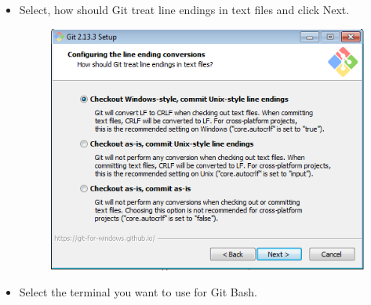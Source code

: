 \documentclass[11pt]{article} %
\begin{document}
\begin{itemize}
        \pagebreak
        \item Select, how should Git treat line endings in text files and click Next. 
        \begin{figure}[h!]
          \centering
          \includegraphics[width=0.7\linewidth]{figs/GitBash7}
          \caption{}
          \label{fig:gitbash7}
        \end{figure}
        \item Select the terminal you want to use for Git Bash. 
        

\end{itemize}
\end{document}
